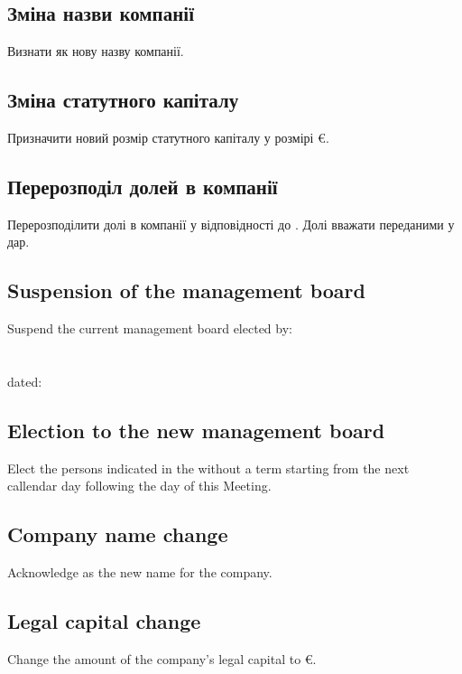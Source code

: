 \begin{Form}
\begin{paracol}{3}
{          \subsection{Зміна назви компанії}
          Визнати  як нову назву компанії.
          \subsection{Зміна статутного капіталу}
          Призначити новий розмір статутного капіталу у розмірі  €.
          \subsection{Перерозподіл долей в компанії}
          Перерозподілити долі в компанії у відповідності до . Долі вважати переданими у дар.
        }
        { \subsection{Suspension of the management board}
          Suspend the current management board elected by:\\
          \\
          \\
          dated:\\
          \subsection{Election to the new management board}
          Elect the persons indicated in the  without a term starting from the next callendar day following the day of this Meeting.
          \subsection{Company name change}
          Acknowledge  as the new name for the company.
          \subsection{Legal capital change}
          Change the amount of the company's legal capital to  €.
}
\end{paracol}
\end{Form}
